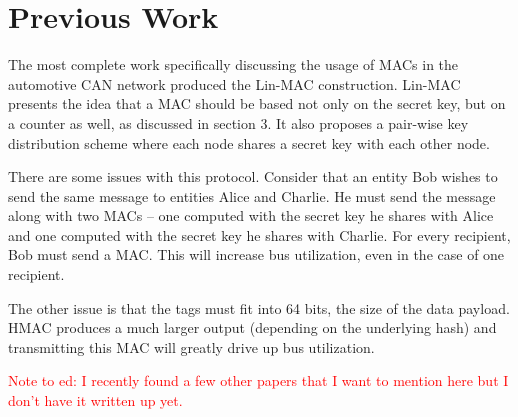 \section{Previous Work}
The most complete work specifically discussing the usage of MACs in the automotive CAN network produced the Lin-MAC construction\cite{Lin-MAC}. Lin-MAC presents the idea that a MAC should be based not only on the secret key, but on a counter as well, as discussed in section 3. It also proposes a pair-wise key distribution scheme where each node shares a secret key with each other node.



There are some issues with this protocol. Consider that an entity Bob wishes to send the same message to entities Alice and Charlie. He must send the message along with two MACs -- one computed with the secret key he shares with Alice and one computed with the secret key he shares with Charlie. For every recipient, Bob must send a MAC. This will increase bus utilization, even in the case of one recipient.

The other issue is that the tags must fit into 64 bits, the size of the data payload. HMAC produces a much larger output (depending on the underlying hash) and transmitting this MAC will greatly drive up bus utilization.


\textcolor{red}{Note to ed: I recently found a few other papers that I want to mention here but I don't have it written up yet.}